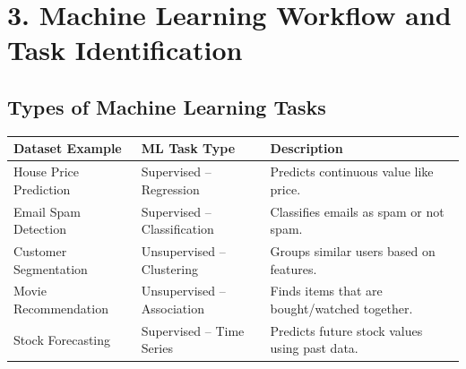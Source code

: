 \documentclass[11pt]{article}
\begin{document}
\section*{3. Machine Learning Workflow and Task Identification}

\subsection*{Types of Machine Learning Tasks}
\begin{table}[h!]
\centering
\renewcommand{\arraystretch}{1.3}
\begin{tabular}{|p{4cm}|p{4cm}|p{6cm}|}
\hline
\textbf{Dataset Example} & \textbf{ML Task Type} & \textbf{Description} \\
\hline
House Price Prediction & Supervised – Regression & Predicts continuous value like price. \\
Email Spam Detection & Supervised – Classification & Classifies emails as spam or not spam. \\
Customer Segmentation & Unsupervised – Clustering & Groups similar users based on features. \\
Movie Recommendation & Unsupervised – Association & Finds items that are bought/watched together. \\
Stock Forecasting & Supervised – Time Series & Predicts future stock values using past data. \\
\hline
\end{tabular}
\end{table}
\end{document}
